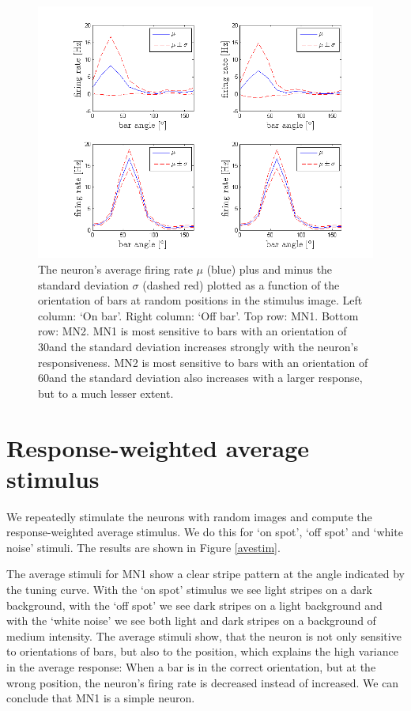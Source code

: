 \documentclass{scrartcl}
\begin{document}
\begin{figure}
\centering
\includegraphics[trim = {1.3cm 0.5cm 1.8cm 0.9cm}, width=\textwidth, clip]{../pics/tuning_on_off}
\caption{The neuron's average firing rate $\mu$ (blue) plus and minus the standard deviation $\sigma$ (dashed red) plotted as a function of the orientation of bars at random positions in the stimulus image. Left column: `On bar'. Right column: `Off bar'. Top row: MN1. Bottom row: MN2. MN1 is most sensitive to bars with an orientation of 30\degree and the standard deviation increases strongly with the neuron's responsiveness. MN2 is most sensitive to bars with an orientation of 60\degree and the standard deviation also increases with a larger response, but to a much lesser extent.}
\label{tuning}
\end{figure}

\section{Response-weighted average stimulus}
We repeatedly stimulate the neurons with random images and compute the response-weighted average stimulus. We do this for `on spot', `off spot' and `white noise' stimuli. The results are shown in Figure \ref{avestim}.

The average stimuli for MN1 show a clear stripe pattern at the angle indicated by the tuning curve. With the `on spot' stimulus we see light stripes on a dark background, with the `off spot' we see dark stripes on a light background and with the `white noise' we see both light and dark stripes on a background of medium intensity. The average stimuli show, that the neuron is not only sensitive to orientations of bars, but also to the position, which explains the high variance in the average response: When a bar is in the correct orientation, but at the wrong position, the neuron's firing rate is decreased instead of increased. We can conclude that MN1 is a simple neuron.
\end{document}
